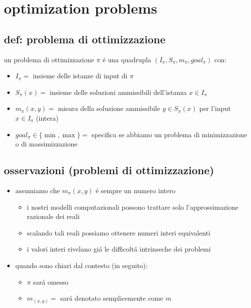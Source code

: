 \section*{optimization problems}


\subsection*{def: problema di ottimizzazione}
un problema di ottimizzazione $\pi$ \'e una quadrupla $(I_{\pi}, S_{\pi}, m_{\pi}, goal_{\pi})$ con:
\begin{itemize}
	\item $I_{\pi}=$ insieme delle istanze di input di $\pi$
	\item $S_{\pi}(x)=$ insieme delle soluzioni ammissibili dell'istanza $x\in I_{\pi}$
	\item $m_{\pi}(x,y)=$ misura della soluzione ammissibile $y\in S_{\pi}(x)$ per l'input $x\in I_{\pi}$ (intera)
	\item $goal_{\pi}\in\{\min,\max\}=$ specifica se abbiamo un problema di minimizzazione o di massimizzazione
\end{itemize}


\subsection*{osservazioni (problemi di ottimizzazione)}
\begin{itemize}
	\item assumiamo che $m_{\pi}(x,y)$ \'e sempre un numero intero
	\begin{itemize}
		\item i nostri modelli computazionali possono trattare solo l'approssimazione razionale dei reali
		\item scalando tali reali possiamo ottenere numeri interi equivalenti
		\item i valori interi rivelano gi\'a le difficolt\'a intrinseche dei problemi
	\end{itemize}
	\item quando sono chiari dal contesto (in seguito):
	\begin{itemize}
		\item $\pi$ sar\'a omesso
		\item $m_(x,y)=$ sar\'a denotato semplicemente come $m$ 
	\end{itemize}
\end{itemize}

